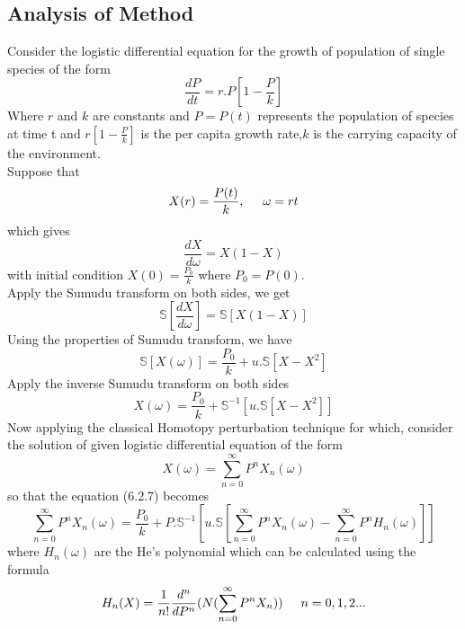 \subsection{Analysis of Method}
Consider the logistic differential equation for the growth of population of single species of the form \cite{R57}
\begin{equation}
\frac{dP}{dt} =r.P[1-\frac{P}{k}]
\end{equation}
Where $r$ and $k$ are constants and $P=P(t)$ represents the population of species at time t and $r[1-\frac{P}{k}]$ is the per capita growth rate,$k$ is the carrying capacity of the environment.\\
Suppose that 
\begin{equation*}
X(r)=\frac{P(t)}{k},\hspace{.5cm}\omega=rt
\end{equation*}
which gives
\begin{equation*}
\frac{dX}{d\omega} =X(1-X)
\end{equation*}
with initial condition $ X(0)=\frac{P_{0}}{k}$ where $ P_{0}=P(0)$.\\
Apply the Sumudu transform on both sides, we get
\begin{equation*}
   \mathbb{S}[ \frac{dX}{d\omega}]  = \mathbb{S}[X(1-X) ]    
\end{equation*}      
Using the properties of Sumudu transform, we have
\begin{equation*}
\mathbb{S}[ X(\omega)] =\frac{P_{0}}{k}+u.\mathbb{S}[ X-X^2]
\end{equation*}
Apply the inverse Sumudu transform on both sides
\begin{equation}
X(\omega) =\frac{P_{0}}{k}+\mathbb{S}^{-1}[ u.\mathbb{S}[ X-X^2]]
\end{equation}
 Now applying the classical Homotopy perturbation technique for which, consider the solution of given logistic differential equation of the form
 \begin{equation*}
 X(\omega)=\sum_{n=0}^{\infty} P^{n}X_{n}(\omega)
 \end{equation*}
 so that the equation (6.2.7) becomes
 \begin{equation*}
  \sum_{n=0}^{\infty} P^{n}X_{n}(\omega)=\frac{P_{0}}{k}+P.\mathbb{S}^{-1}[ u.\mathbb{S}[ \sum_{n=0}^{\infty} P^{n}X_{n}(\omega)-\sum_{n=0}^{\infty} P^{n}H_{n}(\omega)]]
 \end{equation*}
 where $ H_{n}(\omega) $ are the He's polynomial which can be calculated using the formula 
 \begin{equation*}
{  H_{n}(X) = \frac{1}{n!}\frac{d^n}{dP^n}(N(\sum_{n=0}^{\infty} P^nX_{n}))}    \hspace{0.5cm}  n = 0,1,2...
 \end{equation*}
